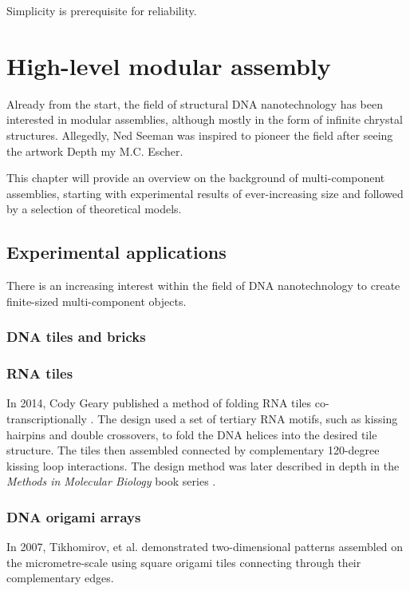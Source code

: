 \begin{savequote}[8cm]
Simplicity is prerequisite for reliability.
\end{savequote}

\chapter{High-level modular assembly}

Already from the start, the field of structural DNA nanotechnology has been interested in modular assemblies, although mostly in the form of infinite chrystal structures. Allegedly, Ned Seeman was inspired to pioneer the field after seeing the artwork Depth my M.C. Escher.

This chapter will provide an overview on the background of multi-component assemblies, starting with experimental results of ever-increasing size and followed by a selection of theoretical models.

\section{Experimental applications} \label{sec:experimental_appl}
There is an increasing interest within the field of DNA nanotechnology to create finite-sized multi-component objects.
\subsection{DNA tiles and bricks}

\subsection{RNA tiles}
In 2014, Cody Geary published a method of folding RNA tiles co-transcriptionally \cite{geary2014single}. The design used a set of tertiary RNA motifs, such as kissing hairpins and double crossovers, to fold the DNA helices into the desired tile structure. The tiles then assembled connected by complementary 120-degree kissing loop interactions. The design method was later described in depth in the \emph{Methods in Molecular Biology} book series \cite{sparvath2017computer}.

\subsection{DNA origami arrays}

In 2007, Tikhomirov, et al.\cite{tikhomirov2017fractal} demonstrated two-dimensional patterns assembled on the micrometre-scale using square origami tiles connecting through their complementary edges. 

